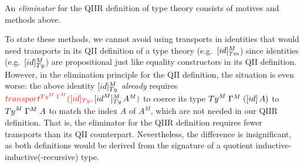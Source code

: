 \documentclass[a4paper,UKenglish,numberwithinsect,cleveref,thm-restate]{lipics-v2021}
\begin{document}
\begin{definition}
  An \emph{eliminator} for the QIIR definition of type theory consists of motives and methods above.
\end{definition}

\begin{remark}
To state these methods, we cannot avoid using transports in identities that would need transports in its QII definition of a type theory (e.g.\ $[\idS]_{\Tm}^M$) since identities (e.g.\ $[\idS]_{\Ty}^M$) are propositional just like equality constructors in its QII definition.
However, in the elimination principle for the QII definition, the situation is even worse: the above identity $[\idS]_{\Ty}^M$ \emph{already} requires $\alert{\transfib{\Ty^M\;\Gamma^M}{[\idS]_{\Ty}}{\color{black}[\idS^M]_{\Ty}^M\,A^M}}$ to coerce its type $\Ty^M\;\Gamma^M\;([\idS]\,A)$ to $\Ty^M\;\Gamma^M\;A$ to match the index $A$ of $A^M$, which are not needed in our QIIR definition.
That is, the eliminator for the QIIR definition requires fewer transports than its QII counterpart.
Nevertheless, the difference is insignificant, as both definitions would be derived from the signature of a quotient inductive-inductive(-recursive) type.
\end{remark}
\end{document}
